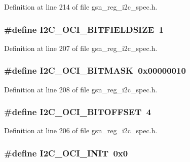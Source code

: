 Definition at line 214 of file gsn\_\-reg\_\-i2c\_\-spec.h.

\hypertarget{a00558_a54b769402e2a2277531507e6509c8d4a}{
\subsubsection[{I2C\_\-OCI\_\-BITFIELDSIZE}]{\setlength{\rightskip}{0pt plus 5cm}\#define I2C\_\-OCI\_\-BITFIELDSIZE~1}}
\label{a00558_a54b769402e2a2277531507e6509c8d4a}


Definition at line 207 of file gsn\_\-reg\_\-i2c\_\-spec.h.

\hypertarget{a00558_aadcc94e4e98b3760c0fed26c2c7d1907}{
\subsubsection[{I2C\_\-OCI\_\-BITMASK}]{\setlength{\rightskip}{0pt plus 5cm}\#define I2C\_\-OCI\_\-BITMASK~0x00000010}}
\label{a00558_aadcc94e4e98b3760c0fed26c2c7d1907}


Definition at line 208 of file gsn\_\-reg\_\-i2c\_\-spec.h.

\hypertarget{a00558_a7600ab560fbcc1f54603e4e7a7a0eef3}{
\subsubsection[{I2C\_\-OCI\_\-BITOFFSET}]{\setlength{\rightskip}{0pt plus 5cm}\#define I2C\_\-OCI\_\-BITOFFSET~4}}
\label{a00558_a7600ab560fbcc1f54603e4e7a7a0eef3}


Definition at line 206 of file gsn\_\-reg\_\-i2c\_\-spec.h.

\hypertarget{a00558_a47114cbce4cc3c2b557c42b686a20337}{
\subsubsection[{I2C\_\-OCI\_\-INIT}]{\setlength{\rightskip}{0pt plus 5cm}\#define I2C\_\-OCI\_\-INIT~0x0}}
\label{a00558_a47114cbce4cc3c2b557c42b686a20337}


